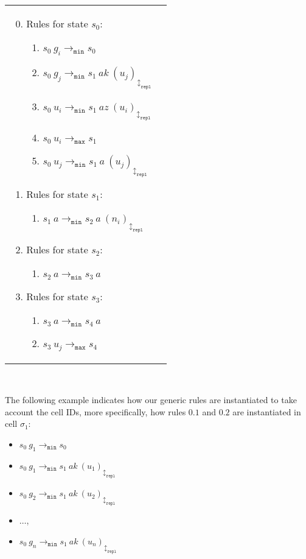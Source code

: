 \documentclass[preliminary,copyright,creativecommons]{eptcs}
\theoremstyle{remark}
\newcommand{\modmin}{\mathtt{min}}
\newcommand{\modmax}{\mathtt{max}}
\newcommand{\modrepl}{\mathtt{repl}}
\begin{document}
\begin{tabular}[t]{ll}
  \begin{minipage}[t]{3.0in}
  \begin{enumerate}
  \setcounter{enumi}{-1}
  \item Rules for state $s_0$:
    \begin{enumerate}[1]
    \item $s_0~ g_i \rightarrow_{\modmin} s_0$
    \item $s_0~ g_j \rightarrow_{\modmin} s_1~ a k~ (u_j)_{\updownarrow_{\modrepl}}$
    \item $s_0~ u_i \rightarrow_{\modmin} s_1~ a z~ (u_i)_{\updownarrow_{\modrepl}}$
  
    \item $s_0~ u_i \rightarrow_{\modmax} s_1$
    \item $s_0~ u_j \rightarrow_{\modmin} s_1~ a~ (u_j)_{\updownarrow_{\modrepl}}$
    \end{enumerate}
  \end{enumerate}
  \end{minipage}

  \begin{minipage}[t]{3.0in}
  \begin{enumerate}
  \setcounter{enumi}{0}
  \item Rules for state $s_1$:
    \begin{enumerate}[1]
    \item $s_1~ a \rightarrow_{\modmin} s_2~ a~ (n_i)_{\updownarrow_{\modrepl}}$
    \end{enumerate}
  \item Rules for state $s_2$:
    \begin{enumerate}[1]
    \item $s_2~ a \rightarrow_{\modmin} s_3~ a$
    \end{enumerate}
  \item Rules for state $s_3$:
    \begin{enumerate}[1]
    \item $s_3~ a \rightarrow_{\modmin} s_4~ a$
    \item $s_3~ u_j \rightarrow_{\modmax} s_4$
    \end{enumerate}
  \end{enumerate}
  \end{minipage}
\end{tabular}

~\

The following example indicates how our generic rules are instantiated to take account  the cell IDs, more specifically, how rules $0.1$ and $0.2$ are instantiated in cell $\sigma_1$:
\begin{itemize}
\item $s_0~ g_1 \rightarrow_{\modmin} s_0$ 
\item $s_0~ g_1 \rightarrow_{\modmin} s_1~ a k~ (u_1)_{\updownarrow_{\modrepl}}$
\item $s_0~ g_2 \rightarrow_{\modmin} s_1~ a k~ (u_2)_{\updownarrow_{\modrepl}}$
\item $\dots$, 
\item $s_0~ g_n \rightarrow_{\modmin} s_1~ a k~ (u_n)_{\updownarrow_{\modrepl}}$
\end{itemize}
\end{document}
